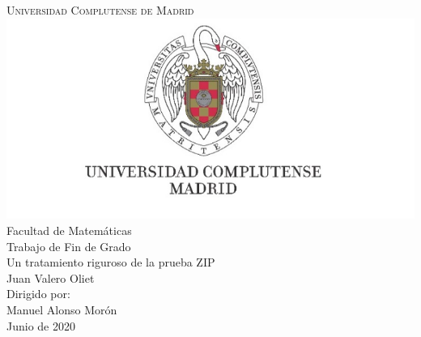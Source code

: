\documentclass[10pt]{report}
\theoremstyle{definition}
\newcommand\blankpage{%
    \null
    \thispagestyle{empty}%
    \newpage}
\begin{document}
\begin{titlepage} %
\begin{center} %

\huge\textsc{Universidad Complutense de Madrid}\\[0.2in]
\includegraphics[scale=0.8]{comlu}\\[0.1in] %

\Large{Facultad de Matemáticas}\\[0.5in] %
\Large{Trabajo de Fin de Grado}\\[.1in]
\Huge {Un tratamiento riguroso de la prueba ZIP}\\[0.2in]



\vfill %
\Large {Juan Valero Oliet}\\[0.5in]
\vfill 
Dirigido por:\\
Manuel Alonso Morón\\[.1in]
\Large{Junio de 2020}
\end{center}

\end{titlepage}


\afterpage{\blankpage}
\end{document}
